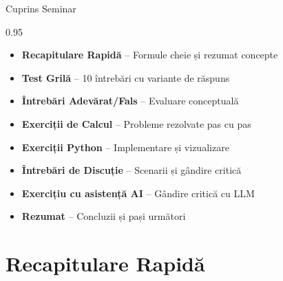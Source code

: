 \documentclass[9pt, aspectratio=169, t]{beamer}
\subtitle{Seminar 4: Cozi Grele --- Skew-$t$, GED și EVT}
\begin{document}
{
\begin{frame}
    \titlepage
\end{frame}
}


\begin{frame}{Cuprins Seminar}
    \begin{cminipage}{0.95\textwidth}
    \begin{itemize}\setlength{\itemsep}{0pt}
        \item \textbf{Recapitulare Rapidă} -- Formule cheie și rezumat concepte
        \vspace{0.15cm}
        \item \textbf{Test Grilă} -- 10 întrebări cu variante de răspuns
        \vspace{0.15cm}
        \item \textbf{Întrebări Adevărat/Fals} -- Evaluare conceptuală
        \vspace{0.15cm}
        \item \textbf{Exerciții de Calcul} -- Probleme rezolvate pas cu pas
        \vspace{0.15cm}
        \item \textbf{Exerciții Python} -- Implementare și vizualizare
        \vspace{0.15cm}
        \item \textbf{Întrebări de Discuție} -- Scenarii și gândire critică
        \vspace{0.15cm}
        \item \textbf{Exercițiu cu asistență AI} -- Gândire critică cu LLM
        \vspace{0.15cm}
        \item \textbf{Rezumat} -- Concluzii și pași următori
    \end{itemize}
    \end{cminipage}
\end{frame}

\section{Recapitulare Rapidă}
\end{document}
